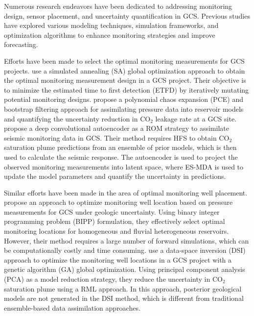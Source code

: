 \documentclass[a4paper,fleqn]{cas-sc}
\begin{document}
Numerous research endeavors have been dedicated to addressing monitoring design, sensor placement, and uncertainty quantification in GCS. Previous studies have explored various modeling techniques, simulation frameworks, and optimization algorithms to enhance monitoring strategies and improve forecasting. 

Efforts have been made to select the optimal monitoring measurements for GCS projects. \citet{Yonkofski2016} use a simulated annealing (SA) global optimization approach to obtain the optimal monitoring measurement design in a GCS project. Their objective is to minimize the estimated time to first detection (ETFD) by iteratively mutating potential monitoring designs. \citet{Oladyshkin2013671} propose a polynomial chaos expansion (PCE) and bootstrap filtering approach for assimilating pressure data into reservoir models and quantifying the uncertainty reduction in CO$_2$ leakage rate at a GCS site. \citet{Liu2020} propose a deep convolutional autoencoder as a ROM strategy to assimilate seismic monitoring data in GCS. Their method requires HFS to obtain CO$_2$ saturation plume predictions from an ensemble of prior models, which is then used to calculate the seismic response. The autoencoder is used to project the observed monitoring measurements into latent space, where ES-MDA is used to update the model parameters and quantify the uncertainty in predictions. 

Similar efforts have been made in the area of optimal monitoring well placement. \citet{Sun2013} propose an approach to optimize monitoring well location based on pressure measurements for GCS under geologic uncertainty. Using binary integer programming problem (BIPP) formulation, they effectively select optimal monitoring locations for homogeneous and fluvial heterogeneous reservoirs. However, their method requires a large number of forward simulations, which can be computationally costly and time consuming. \citet{Sun2019} use a data-space inversion (DSI) approach to optimize the monitoring well locations in a GCS project with a genetic algorithm (GA) global optimization. Using principal component analysis (PCA) as a model reduction strategy, they reduce the uncertainty in CO$_2$ saturation plume using a RML approach. In this approach, posterior geological models are not generated in the DSI method, which is different from traditional ensemble-based data assimilation approaches. 
\end{document}
